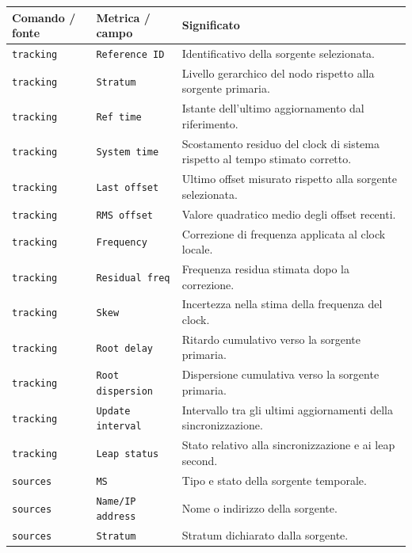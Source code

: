 \begin{table}[H]
  \centering
  \footnotesize
  \setlength{\tabcolsep}{3.5pt}
  \renewcommand{\arraystretch}{1.10}
  \begin{tabularx}{\textwidth}{p{} p{} Y}
    \toprule
    \textbf{Comando / fonte} & \textbf{Metrica / campo} & \textbf{Significato} \\
    \midrule
    \texttt{tracking} & \texttt{Reference ID} & Identificativo della sorgente selezionata. \\
    \texttt{tracking} & \texttt{Stratum} & Livello gerarchico del nodo rispetto alla sorgente primaria. \\
    \texttt{tracking} & \texttt{Ref time} & Istante dell'ultimo aggiornamento dal riferimento. \\
    \texttt{tracking} & \texttt{System time} & Scostamento residuo del clock di sistema rispetto al tempo stimato corretto. \\
    \texttt{tracking} & \texttt{Last offset} & Ultimo offset misurato rispetto alla sorgente selezionata. \\
    \texttt{tracking} & \texttt{RMS offset} & Valore quadratico medio degli offset recenti. \\
    \texttt{tracking} & \texttt{Frequency} & Correzione di frequenza applicata al clock locale. \\
    \texttt{tracking} & \texttt{Residual freq} & Frequenza residua stimata dopo la correzione. \\
    \texttt{tracking} & \texttt{Skew} & Incertezza nella stima della frequenza del clock. \\
    \texttt{tracking} & \texttt{Root delay} & Ritardo cumulativo verso la sorgente primaria. \\
    \texttt{tracking} & \texttt{Root dispersion} & Dispersione cumulativa verso la sorgente primaria. \\
    \texttt{tracking} & \texttt{Update interval} & Intervallo tra gli ultimi aggiornamenti della sincronizzazione. \\
    \texttt{tracking} & \texttt{Leap status} & Stato relativo alla sincronizzazione e ai leap second. \\
    \midrule
    \texttt{sources} & \texttt{MS} & Tipo e stato della sorgente temporale. \\
    \texttt{sources} & \texttt{Name/IP address} & Nome o indirizzo della sorgente. \\
    \texttt{sources} & \texttt{Stratum} & Stratum dichiarato dalla sorgente. \\

\end{tabularx}
\end{table}

